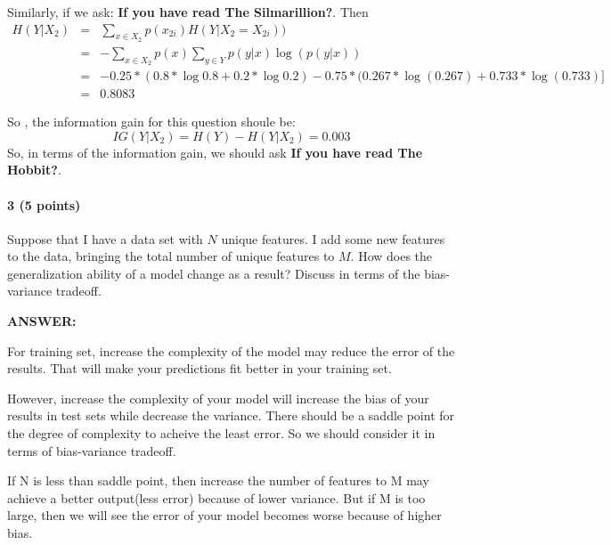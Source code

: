 \documentclass[11pt]{article}
\begin{document}
\par Similarly, if we ask: \textbf{If you have read The Silmarillion?}. Then
\begin{eqnarray}
H(Y|X_2) &=& \sum_{x \in X_2}p(x_{2i})H(Y|X_2 = X_{2i})) \\
&=& -\sum_{x \in X_2}p(x) \sum_{y \in Y}p(y| x) \log(p(y|x))\\
&=&  - 0.25 * (0.8 * \log0.8 + 0.2 * \log0.2)
 -0.75* (0.267 * \log(0.267) + 0.733*\log(0.733)] \\
&=& 0.8083
\end{eqnarray}
\par So , the information gain for this question shoule be:
\begin{equation}
IG(Y|X_2) = H(Y) - H(Y|X_2) = 0.003
\end{equation}
So, in terms of the information gain, we should ask \textbf{If you have read The Hobbit?}.

\paragraph{3 (5 points)}
Suppose that I have a data set with $N$ unique features. I add some new features to the data, bringing the total number of unique features to $M$. How does the  generalization ability of a model change as a result? Discuss in terms of the bias-variance tradeoff.
\par \textbf{ANSWER:}
\par For training set, increase the complexity of the model may reduce the error of the results. That will make your predictions fit better in your training set. 
\par However, increase the complexity of your model will increase the bias of your results in test sets while decrease the variance. There should be a saddle point for the degree of complexity to acheive the least error. So we should consider it in terms of bias-variance tradeoff. 
\par If N is less than saddle point, then increase the number of features to M may achieve a better output(less error) because of lower variance. But if M is too large, then we will see the error of your model becomes worse because of higher bias.
\end{document}
